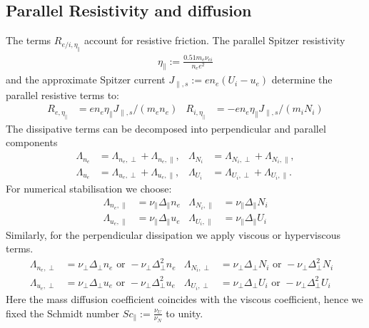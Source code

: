 \subsection{Parallel Resistivity and diffusion}\label{sec:dissres}
The terms $R_{e/i,\eta_\parallel}$ account for resistive friction.
The parallel Spitzer resistivity
\begin{align}
\eta_\parallel := \frac{0.51 m_e \nu_{ei}}{n_e e^2}
\end{align}
and the approximate Spitzer current \(J_{\parallel,s}:= e n_e \left(U_i - u_e\right)\) determine the parallel resistive terms to:
\begin{align}
  R_{e,\eta_\parallel} &=  en_e\eta_\parallel J_{\parallel,s}/(m_en_e)  &
  R_{i,\eta_\parallel} &=- en_e\eta_\parallel J_{\parallel,s}/(m_iN_i)
\end{align}
The dissipative terms can be decomposed into perpendicular and parallel components
\begin{align}
 \Lambda_{n_e} &= \Lambda_{n_e,\perp}+\Lambda_{n_e,\parallel}, &
 \Lambda_{N_i} &= \Lambda_{N_i,\perp}+\Lambda_{N_i,\parallel},\\
 \Lambda_{u_e} &= \Lambda_{u_e,\perp}+\Lambda_{u_e,\parallel},&
 \Lambda_{U_i} &= \Lambda_{U_i,\perp}+\Lambda_{U_i,\parallel}.
\end{align}
For numerical stabilisation we choose:
\begin{align}
\Lambda_{n_e,\parallel} &= \nu_\parallel \Delta_\parallel n_e &
\Lambda_{N_i,\parallel} &= \nu_\parallel \Delta_\parallel N_i \\
\Lambda_{u_e,\parallel} &= \nu_\parallel \Delta_\parallel u_e &
\Lambda_{U_i,\parallel} &= \nu_\parallel \Delta_\parallel U_i 
\end{align}
Similarly, for the perpendicular dissipation we apply viscous or hyperviscous terms.
\begin{align}\label{eq:perpdiffNT}
 \Lambda_{n_e,\perp} &=  \nu_\perp \Delta_\perp n_e \text{ or } -\nu_\perp \Delta_\perp^2 n_e&
 \Lambda_{N_i,\perp} &=  \nu_\perp \Delta_\perp N_i \text{ or } -\nu_\perp \Delta_\perp^2 N_i & \\
 \Lambda_{u_e,\perp} &=  \nu_\perp \Delta_\perp u_e \text{ or } -\nu_\perp \Delta_\perp^2 u_e &
 \Lambda_{U_i,\perp} &=  \nu_\perp \Delta_\perp U_i \text{ or } -\nu_\perp \Delta_\perp^2 U_i
\end{align}
Here the mass diffusion coefficient coincides with the viscous coefficient, hence we fixed the Schmidt number \(\mathit{Sc}_\parallel:= \frac{\nu_U}{\nu_N}\) to unity.

